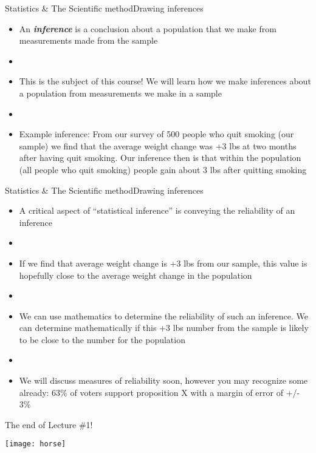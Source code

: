 \documentclass[xcolor=dvipsnames]{beamer}
\begin{document}
\begin{frame}{Statistics \& The Scientific method}{Drawing inferences}
	\begin{itemize}
		\item An \textbf{\emph{inference}} is a conclusion about a population that we make from measurements made from the sample  \pause
		\item[]
		\item This is the subject of this course! We will learn how we make inferences about a population from measurements we make in a sample \pause
		\item[]
		\item Example inference: From our survey of 500 people who quit smoking (our sample) we find that the average weight change was +3 lbs at two months after having quit smoking. Our inference then is that within the population (all people who quit smoking) people gain about 3 lbs after quitting smoking 
	\end{itemize}
\end{frame}

\begin{frame}{Statistics \& The Scientific method}{Drawing inferences}
	\begin{itemize}
		\item A critical aspect of ``statistical inference'' is conveying the reliability of an inference \pause
		\item[]
		\item If we find that average weight change is +3 lbs from our sample, this value is hopefully close to the average weight change in the population \pause
		\item[]
		\item We can use mathematics to determine the reliability of such an inference. We can determine mathematically if this +3 lbs number from the sample is likely to be close to the number for the population \pause
		\item[]
		\item We will discuss measures of reliability soon, however you may recognize some already: 63\% of voters support proposition X with a margin of error of +/- 3\%
	\end{itemize}
\end{frame}

\begin{frame}{The end of Lecture \#1!}
	\begin{center}
		\texttt{[image: horse]}
	\end{center}
\end{frame}
\end{document}
